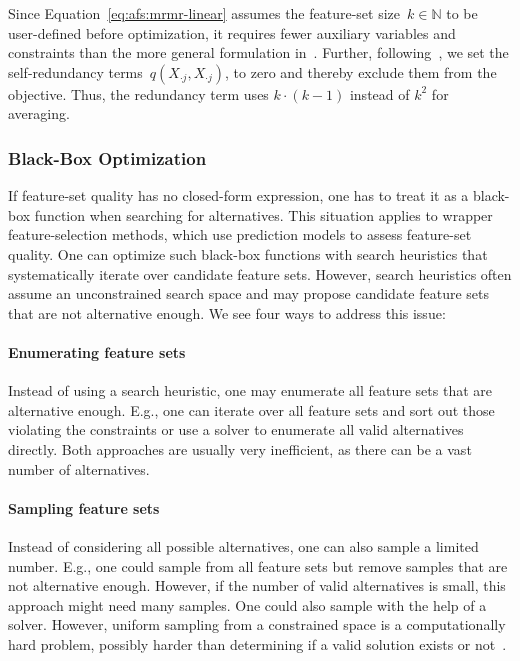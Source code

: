 \documentclass{article}
\theoremstyle{definition}
\begin{document}
Since Equation~\ref{eq:afs:mrmr-linear} assumes the feature-set size~$k \in \mathbb{N}$ to be user-defined before optimization, it requires fewer auxiliary variables and constraints than the more general formulation in~\cite{nguyen2009optimizing, nguyen2010towards}.
Further, following~\cite{nguyen2014effective}, we set the self-redundancy terms~$q(X_{\cdot{}j},X_{\cdot{}j})$, to zero and thereby exclude them from the objective.
Thus, the redundancy term uses $k \cdot (k-1)$ instead of $k^2$ for averaging.

\subsubsection{Black-Box Optimization}
\label{sec:afs:approach:objectives:black-box}

If feature-set quality has no closed-form expression, one has to treat it as a black-box function when searching for alternatives.
This situation applies to wrapper feature-selection methods, which use prediction models to assess feature-set quality.
One can optimize such black-box functions with search heuristics that systematically iterate over candidate feature sets.
However, search heuristics often assume an unconstrained search space and may propose candidate feature sets that are not alternative enough.
We see four ways to address this issue:

\paragraph{Enumerating feature sets}

Instead of using a search heuristic, one may enumerate all feature sets that are alternative enough.
E.g., one can iterate over all feature sets and sort out those violating the constraints or use a solver to enumerate all valid alternatives directly.
Both approaches are usually very inefficient, as there can be a vast number of alternatives.

\paragraph{Sampling feature sets}

Instead of considering all possible alternatives, one can also sample a limited number.
E.g., one could sample from all feature sets but remove samples that are not alternative enough.
However, if the number of valid alternatives is small, this approach might need many samples.
One could also sample with the help of a solver.
However, uniform sampling from a constrained space is a computationally hard problem, possibly harder than determining if a valid solution exists or not~\cite{ermon2012uniform}.
\end{document}
